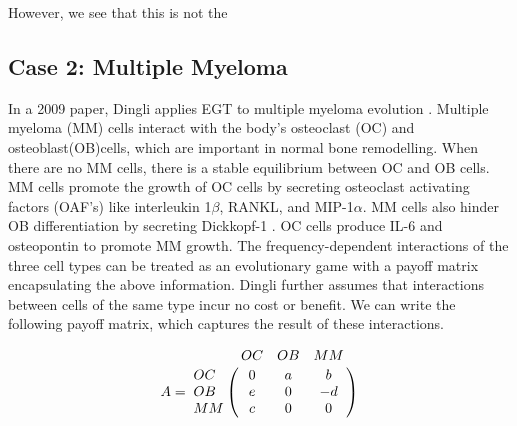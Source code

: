 \documentclass[12pt]{amsart}
\newcommand{\comment}[1]{}
\begin{document}
However, we see that this is not the 


  	




\subsection{Case 2: Multiple Myeloma}
In a 2009 paper, Dingli applies EGT to multiple myeloma evolution \cite{Dingli2009}. Multiple myeloma (MM) cells interact with the body's osteoclast (OC) and osteoblast(OB)cells, which are important in normal bone remodelling. When there are no MM cells, there is a stable equilibrium between OC and OB cells. MM cells promote the growth of OC cells by secreting osteoclast activating factors (OAF's) like interleukin  1$\beta$, RANKL, and MIP-1$\alpha$. MM cells also hinder OB differentiation by secreting Dickkopf-1 \cite{Dingli2009}. OC cells produce IL-6 and osteopontin to promote MM growth. The frequency-dependent interactions of the three cell types can be treated as an evolutionary game with a payoff matrix encapsulating the above information. Dingli further assumes that interactions between cells of the same type incur no cost or benefit. We can write the following payoff matrix, which captures the result of these interactions. 

$$A = \bordermatrix{\text{}&OC&OB&MM\cr
                OC& 0 & a& b \cr
                OB& e  &  0 & -d \cr
                MM& c & 0 & 0 \cr
               }$$
\end{document}
